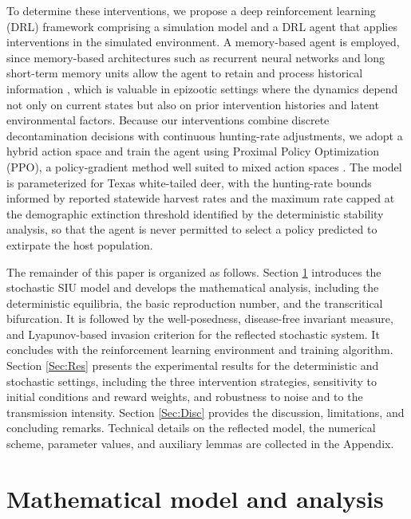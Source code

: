 \documentclass[12pt,a4paper,reqno]{amsart}
\theoremstyle{definition}
\theoremstyle{remark}
\theoremstyle{plain}
\begin{document}
To determine these interventions, we propose a deep reinforcement learning (DRL) framework comprising a simulation model and a DRL agent that applies interventions in the simulated environment. A memory-based agent is employed, since memory-based architectures such as recurrent neural networks and long short-term memory units allow the agent to retain and process historical information \cite{bakker2001reinforcement, goodfellow2016deep, hochreiter1997long}, which is valuable in epizootic settings where the dynamics depend not only on current states but also on prior intervention histories and latent environmental factors. Because our interventions combine discrete decontamination decisions with continuous hunting-rate adjustments, we adopt a hybrid action space and train the agent using Proximal Policy Optimization (PPO), a policy-gradient method well suited to mixed action spaces \cite{schulman2017proximal}. The model is parameterized for Texas white-tailed deer, with the hunting-rate bounds informed by reported statewide harvest rates and the maximum rate capped at the demographic extinction threshold identified by the deterministic stability analysis, so that the agent is never permitted to select a policy predicted to extirpate the host population.

The remainder of this paper is organized as follows. Section \ref{Sec:Model} introduces the stochastic SIU model and develops the mathematical analysis, including the deterministic equilibria, the basic reproduction number, and the transcritical bifurcation. It is followed by the well-posedness, disease-free invariant measure, and Lyapunov-based invasion criterion for the reflected stochastic system. It concludes with the reinforcement learning environment and training algorithm. Section \ref{Sec:Res} presents the experimental results for the deterministic and stochastic settings, including the three intervention strategies, sensitivity to initial conditions and reward weights, and robustness to noise and to the transmission intensity. Section \ref{Sec:Disc} provides the discussion, limitations, and concluding remarks. Technical details on the reflected model, the numerical scheme, parameter values, and auxiliary lemmas are collected in the Appendix.

\section{Mathematical model and analysis}\label{Sec:Model}
\end{document}

